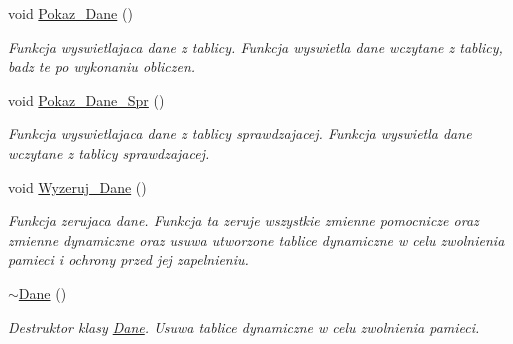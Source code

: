 \begin{DoxyCompactItemize}
void \hyperlink{class_dane_a84cd5938a2dc0aaab4287cd58c8bd0d2}{\-Pokaz\-\_\-\-Dane} ()
\begin{DoxyCompactList}\small\item\em \-Funkcja wyswietlajaca dane z tablicy. \-Funkcja wyswietla dane wczytane z tablicy, badz te po wykonaniu obliczen. \end{DoxyCompactList}\item 
void \hyperlink{class_dane_a644482d17f85bb48d81ce5174d4425e6}{\-Pokaz\-\_\-\-Dane\-\_\-\-Spr} ()
\begin{DoxyCompactList}\small\item\em \-Funkcja wyswietlajaca dane z tablicy sprawdzajacej. \-Funkcja wyswietla dane wczytane z tablicy sprawdzajacej. \end{DoxyCompactList}\item 
void \hyperlink{class_dane_a922c52bcc8c6ff4f49f5e3ae3d48a5d7}{\-Wyzeruj\-\_\-\-Dane} ()
\begin{DoxyCompactList}\small\item\em \-Funkcja zerujaca dane. \-Funkcja ta zeruje wszystkie zmienne pomocnicze oraz zmienne dynamiczne oraz usuwa utworzone tablice dynamiczne w celu zwolnienia pamieci i ochrony przed jej zapelnieniu. \end{DoxyCompactList}\item 
\hyperlink{class_dane_ad0ab5b58f60dae17303291e8f0a49151}{$\sim$\-Dane} ()
\begin{DoxyCompactList}\small\item\em \-Destruktor klasy \hyperlink{class_dane}{\-Dane}. \-Usuwa tablice dynamiczne w celu zwolnienia pamieci. \end{DoxyCompactList}\end{DoxyCompactItemize}
